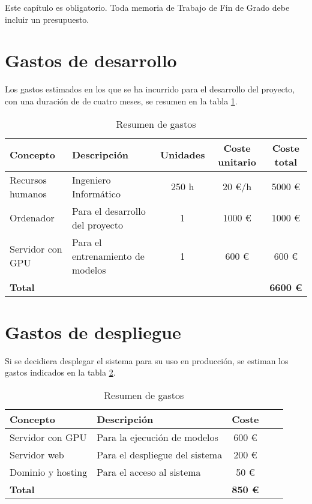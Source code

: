Este capítulo es obligatorio. Toda memoria de Trabajo de Fin de Grado debe incluir un presupuesto.

\section{Gastos de desarrollo}
Los gastos estimados en los que se ha incurrido para el desarrollo del proyecto, con una duración de de cuatro meses,
 se resumen en la tabla \ref{tabla_presupuesto_desarrollo}. 

\begin{table}[h]
   \centering
   \small
   \caption{Resumen de gastos}
   \begin{tabular}{|l|l|c|c|c|}
      \hline
      \textbf{Concepto} & \textbf{Descripción} & \textbf{Unidades} & \textbf{Coste unitario} & \textbf{Coste total} \\ \hline
      Recursos humanos & Ingeniero Informático & 250 h & 20 €/h & 5000 € \\ \hline
      Ordenador & Para el desarrollo del proyecto & 1 & 1000 € & 1000 € \\ \hline
      Servidor con GPU & Para el entrenamiento de modelos & 1 & 600 € & 600 € \\ \hline
      \textbf{Total} & & & & \textbf{6600 €} \\ \hline
   \end{tabular}
   \label{tabla_presupuesto_desarrollo}
\end{table}

\section{Gastos de despliegue}
Si se decidiera desplegar el sistema para su uso en producción, se estiman los gastos indicados
en la tabla \ref{tabla_presupuesto_despliegue}.

\begin{table}[h]
   \centering
   \small
   \caption{Resumen de gastos}
   \begin{tabular}{|l|l|c|c|c|}
      \hline
      \textbf{Concepto} & \textbf{Descripción} & \textbf{Coste} \\ \hline
      Servidor con GPU & Para la ejecución de modelos  & 600 € \\ \hline
      Servidor web & Para el despliegue del sistema  & 200 € \\ \hline
      Dominio y hosting & Para el acceso al sistema  & 50 € \\ \hline
      \textbf{Total}  & & \textbf{850 €} \\ \hline
   \end{tabular}
   \label{tabla_presupuesto_despliegue}
\end{table}